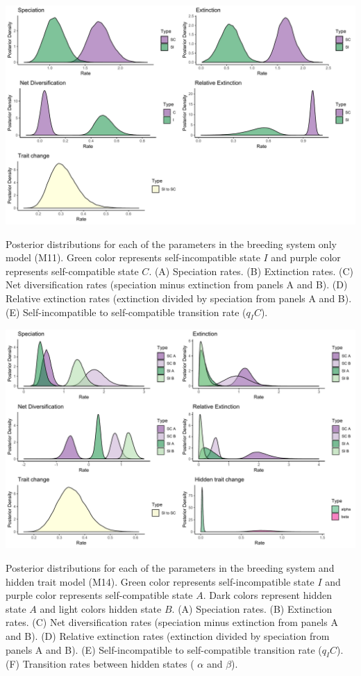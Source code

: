 \begin{suppfigure}
\includegraphics[width=\textwidth]{figS5.pdf}
\caption{Posterior distributions for each of the parameters in the breeding system only model (M11). Green color represents self-incompatible state $I$ and purple color represents self-compatible state $C$.  (A) Speciation rates. (B) Extinction rates. (C) Net diversification rates (speciation minus extinction from panels A and B). (D) Relative extinction rates (extinction divided by speciation from panels A and B). (E) Self-incompatible to self-compatible transition rate ($q_IC$).} %
\label{suppfigure:IC}
\end{suppfigure}


\begin{suppfigure}
\includegraphics[width=\textwidth]{figS6.pdf}
\caption{Posterior distributions for each of the parameters in the breeding system and hidden trait model (M14). Green color represents self-incompatible state $I$ and purple color represents self-compatible state $A$. Dark colors represent hidden state $A$ and light colors hidden state $B$.  (A) Speciation rates. (B) Extinction rates. (C) Net diversification rates (speciation minus extinction from panels A and B). (D) Relative extinction rates (extinction divided by speciation from panels A and B). (E) Self-incompatible to self-compatible transition rate ($q_IC$). (F) Transition rates between hidden states ( $\alpha$ and $\beta$).} %
\label{suppfigure:ICAB}
\end{suppfigure}


